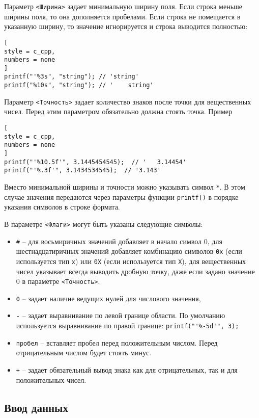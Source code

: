 \documentclass[%
	11pt,
	a4paper,
	utf8,
		]{article}
\begin{document}
Параметр \verb|<Ширина>| задает минимальную ширину поля. Если строка меньше ширины поля, то она дополняется пробелами. Если строка не помещается в указанную ширину, то значение игнорируется и строка выводится полностью:
\begin{lstlisting}[
style = c_cpp,
numbers = none
]
printf("'%3s", "string"); // 'string'
printf("%10s", "string"); // '    string'
\end{lstlisting}

Параметр \verb*|<Точность>| задает количество знаков после точки для вещественных чисел. Перед этим параметром обязательно должна стоять точка. Пример
\begin{lstlisting}[
style = c_cpp,
numbers = none
]
printf("'%10.5f'", 3.1445454545);  // '   3.14454'
printf("'%.3f'", 3.1434534545);  // '3.143'
\end{lstlisting}

Вместо минимальной ширины и точности можно указывать символ \verb*|*|. В этом случае значения передаются через параметры функции \verb*|printf()| в порядке указания символов в строке формата.

В параметре \verb|<Флаги>| могут быть указаны следующие символы:
\begin{itemize}
	\item \verb*|#| -- для восьмиричных значений добавляет в начало символ 0, для шестнадцатиричных значений добавляет комбинацию символов \verb|0x| (если используется тип \verb*|x|) или \verb|0X| (если используется тип \verb*|X|), для вещественных чисел указывает всегда выводить дробную точку, даже если задано значение 0 в параметре \verb|<Точность>|.
	
	\item \verb*|0| -- задает наличие ведущих нулей для числового значения,
	
	\item \verb|-| -- задает выравнивание по левой границе области. По умолчанию используется выравнивание по правой границе: \verb|printf("'%-5d'", 3);|
	
	\item \verb|пробел| -- вставляет пробел перед положительным числом. Перед отрицательным числом будет стоять минус.
	
	\item \verb*|+| -- задает обязательный вывод знака как для отрицательных, так и для положительных чисел.
\end{itemize}

\subsection{Ввод данных}
\end{document}
